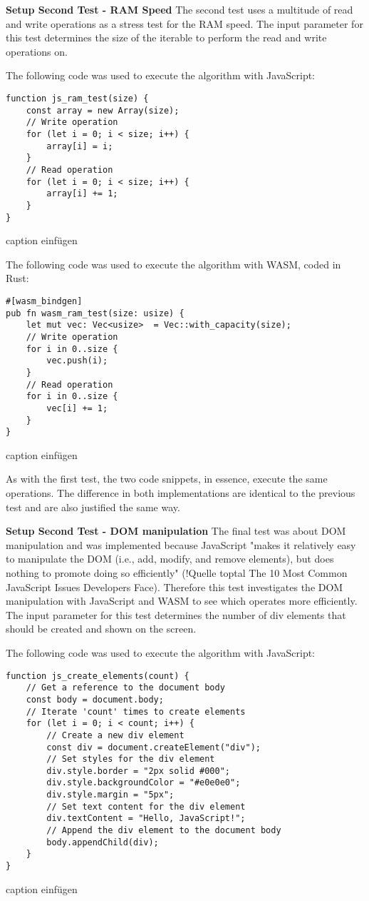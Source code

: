 \textbf{Setup Second Test - RAM Speed} \newline
The second test uses a multitude of read and write operations as a stress test for the RAM speed. The input parameter for this test determines the size of the iterable to perform the read and write operations on.

The following code was used to execute the algorithm with JavaScript:
\begin{verbatim}
function js_ram_test(size) {
    const array = new Array(size);
    // Write operation
    for (let i = 0; i < size; i++) {
        array[i] = i;
    }
    // Read operation
    for (let i = 0; i < size; i++) {
        array[i] += 1;
    }
}
\end{verbatim}
caption einfügen

The following code was used to execute the algorithm with WASM, coded in Rust:
\begin{verbatim}
#[wasm_bindgen]
pub fn wasm_ram_test(size: usize) {
    let mut vec: Vec<usize>  = Vec::with_capacity(size);
    // Write operation
    for i in 0..size {
        vec.push(i);
    }
    // Read operation
    for i in 0..size {
        vec[i] += 1;
    }
}
\end{verbatim}
caption einfügen

As with the first test, the two code snippets, in essence, execute the same operations. The difference in both implementations are identical to the previous test and are also justified the same way. 

\textbf{Setup Second Test - DOM manipulation} \newline
The final test was about DOM manipulation and was implemented because JavaScript "makes it relatively easy to manipulate the DOM (i.e., add, modify, and remove elements), but does nothing to promote doing so efficiently" (!Quelle toptal The 10 Most Common JavaScript Issues Developers Face). Therefore this test investigates the DOM manipulation with JavaScript and WASM to see which operates more efficiently. The input parameter for this test determines the number of div elements that should be created and shown on the screen.

The following code was used to execute the algorithm with JavaScript:
\begin{verbatim}
function js_create_elements(count) {
    // Get a reference to the document body
    const body = document.body;
    // Iterate 'count' times to create elements
    for (let i = 0; i < count; i++) {
        // Create a new div element
        const div = document.createElement("div");
        // Set styles for the div element
        div.style.border = "2px solid #000";
        div.style.backgroundColor = "#e0e0e0";
        div.style.margin = "5px";
        // Set text content for the div element
        div.textContent = "Hello, JavaScript!";
        // Append the div element to the document body
        body.appendChild(div);
    }
}
\end{verbatim}
caption einfügen


